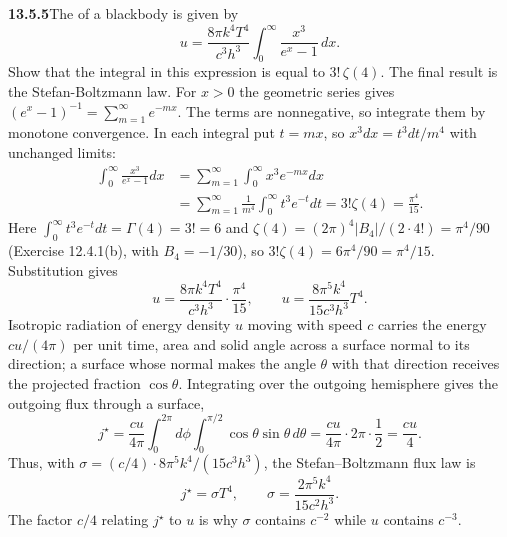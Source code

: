 \par\bigskip
\noindent\textbf{13.5.5}\quad The  of a blackbody is
given by
\[
u=\frac{8\pi k^{4}T^{4}}{c^{3}h^{3}}
\int_{0}^{\infty}\frac{x^{3}}{e^{x}-1}\,dx.
\]
Show that the integral in this expression is equal to $3!\,\zeta(4)$. The
final result is the Stefan-Boltzmann law.
\solution
For $x>0$ the geometric series gives
$(e^x-1)^{-1}=\sum_{m=1}^{\infty}e^{-mx}$.
The terms are nonnegative, so integrate them by monotone
convergence.  In each integral put $t=mx$, so
$x^3dx=t^3dt/m^4$ with unchanged limits:
\begin{align*}
\int_0^\infty\frac{x^3}{e^x-1}dx
&=\sum_{m=1}^{\infty}\int_0^\infty x^3e^{-mx}dx\\
&=\sum_{m=1}^{\infty}\frac1{m^4}\int_0^\infty t^3e^{-t}dt
=\boxed{3!\zeta(4)}=\frac{\pi^4}{15}.
\end{align*}
Here $\int_0^\infty t^3e^{-t}dt=\Gamma(4)=3!=6$ and
$\zeta(4)=(2\pi)^4|B_4|/(2\cdot4!)=\pi^4/90$ (Exercise 12.4.1(b),
with $B_4=-1/30$), so $3!\zeta(4)=6\pi^4/90=\pi^4/15$.
Substitution gives
\[
u=\frac{8\pi k^4T^4}{c^3h^3}\cdot\frac{\pi^4}{15},\qquad
\boxed{u=\frac{8\pi^5 k^4}{15c^3h^3}T^4}.
\]
Isotropic radiation of energy density $u$ moving with speed $c$
carries the energy $cu/(4\pi)$ per unit time, area and solid
angle across a surface normal to its direction; a surface whose
normal makes the angle $\theta$ with that direction receives the
projected fraction $\cos\theta$.  Integrating over the outgoing
hemisphere gives the outgoing flux through a surface,
\[
j^\star=\frac{cu}{4\pi}
\int_0^{2\pi}d\phi\int_0^{\pi/2}\cos\theta\sin\theta\,d\theta
=\frac{cu}{4\pi}\cdot2\pi\cdot\frac12=\frac{cu}{4}.
\]
Thus, with $\sigma=(c/4)\cdot8\pi^5k^4/(15c^3h^3)$, the
Stefan--Boltzmann flux law is
\[
\boxed{j^\star=\sigma T^4,\qquad
\sigma=\frac{2\pi^5k^4}{15c^2h^3}}.
\]
The factor $c/4$ relating $j^\star$ to $u$ is why $\sigma$
contains $c^{-2}$ while $u$ contains $c^{-3}$.


